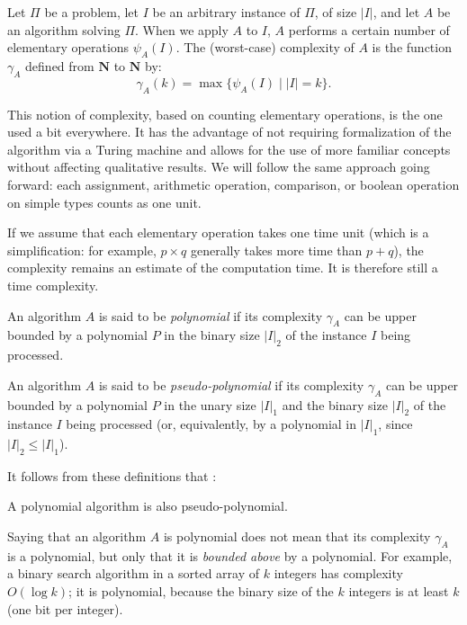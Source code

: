 \begin{definition}[Complexity]
    Let $\Pi$ be a problem, let $I$ be an arbitrary instance of $\Pi$, of size $|I|$, and let $A$ be an algorithm solving $\Pi$. When we apply $A$ to $I$, $A$ performs a certain number of elementary operations $\psi_A(I)$. The (worst-case) complexity of $A$ is the function $\gamma_A$ defined from $\mathbf{N}$ to $\mathbf{N}$ by:
    \[
    \gamma_A(k) = \max\{\psi_A(I) \mid |I| = k\}.
    \]
\end{definition}

This notion of complexity, based on counting elementary operations, is the one used a bit everywhere. It has the advantage of not requiring formalization of the algorithm via a Turing machine and allows for the use of more familiar concepts without affecting qualitative results. We will follow the same approach going forward: each assignment, arithmetic operation, comparison, or boolean operation on simple types counts as one unit.

If we assume that each elementary operation takes one time unit (which is a simplification: for example, $p \times q$ generally takes more time than $p + q$), the complexity remains an estimate of the computation time. It is therefore still a time complexity.

\begin{definition}
    An algorithm $A$ is said to be \textit{polynomial} if its complexity $\gamma_A$ can be upper bounded by a polynomial $P$ in the binary size $|I|_2$ of the instance $I$ being processed.
\end{definition}

\begin{definition}
    An algorithm $A$ is said to be \textit{pseudo-polynomial} if its complexity $\gamma_A$ can be upper bounded by a polynomial $P$ in the unary size $|I|_1$ and the binary size $|I|_2$ of the instance $I$ being processed (or, equivalently, by a polynomial in $|I|_1$, since $|I|_2 \leq |I|_1$).
\end{definition}

It follows from these definitions that :

\begin{proposition}
    A polynomial algorithm is also pseudo-polynomial.
\end{proposition}

Saying that an algorithm $A$ is polynomial does not mean that its complexity $\gamma_A$ is a polynomial, but only that it is \textit{bounded above} by a polynomial. For example, a binary search algorithm in a sorted array of $k$ integers has complexity $O(\log k)$; it is polynomial, because the binary size of the $k$ integers is at least $k$ (one bit per integer).

